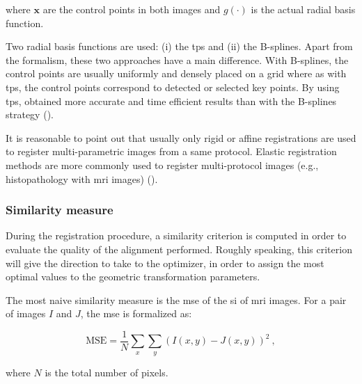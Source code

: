 \noindent where $\mathbf{x}$ are the control points in both images and $g(\cdot)$ is the actual radial basis function. 

Two radial basis functions are used: (i) the \ac{tps} and (ii) the B-splines. Apart from the formalism, these two approaches have a main difference. With B-splines, the control points are usually uniformly and densely placed on a grid where as with \ac{tps}, the control points correspond to detected or selected key points. By using \ac{tps}, \cite{Mitra2011} obtained more accurate and time efficient results than with the B-splines strategy (\cite{Mitra2012a}). %

It is reasonable to point out that usually only rigid or affine registrations are used to register multi-parametric images from a same protocol. Elastic registration methods are more commonly used to register multi-protocol images (e.g., histopathology with \ac{mri} images) (\cite{Toth2008,Toth2009}).

\subsubsection{Similarity measure}\label{subsubsec:simmea}

During the registration procedure, a similarity criterion is computed in order to evaluate the quality of the alignment performed. Roughly speaking, this criterion will give the direction to take to the optimizer, in order to assign the most optimal values to the geometric transformation parameters.

The most naive similarity measure is the \acf{mse} of the \ac{si} of \ac{mri} images. For a pair of images $I$ and $J$, the \ac{mse} is formalized as:

\begin{equation}
	\text{MSE} =\frac{1}{N} \sum_x \sum_y ( I(x,y) - J(x,y) )^2 \ ,
	\label{eq:mse}
\end{equation}

\noindent where $N$ is the total number of pixels.

